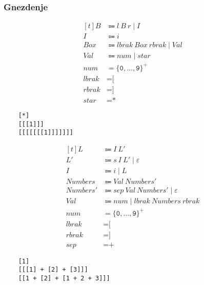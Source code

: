 \documentclass{report}
\newcommand{\Null}{\varepsilon}
\newcommand{\Char}[1]{\texttt{#1}}
\newcommand{\Spc}{\ }
\newcommand{\Union}{\mathrel{|}}
\newcommand{\KleenePlus}[1]{#1^+}
\newcommand{\Arrow}{\Coloneq}
\newcommand{\NT}[1]{{#1}}
\newcommand{\T}[1]{{#1}}
\begin{document}
    \subsubsection{Gnezdenje}

    \begin{equation*}
      \begin{aligned}[t]
        \NT{B} &\Arrow \T{l} \Spc \NT{B} \Spc \T{r} \Union \NT{I}\\
        \NT{I} &\Arrow \T{i}\\[1em]
        \NT{Box} &\Arrow \T{lbrak} \Spc \NT{Box} \Spc \T{rbrak} \Union \NT{Val}\\
        \NT{Val} &\Arrow \T{num} \Union \T{star}\\[1em]
        \T{num} &= \KleenePlus{\{\Char{0}, \dots, \Char{9}\}}\\
        \T{lbrak} &= \Char{[}\\
        \T{rbrak} &= \Char{]}\\
        \T{star} &= \Char{*}
      \end{aligned}
    \end{equation*}
    \begin{lstlisting}
    [*]
    [[[1]]]
    [[[[[[[1]]]]]]]
    \end{lstlisting}

    \begin{equation*}
      \begin{aligned}[t]
        \NT{L} &\Arrow \NT{I} \Spc \NT{L'}\\
        \NT{L'} &\Arrow \T{s} \Spc \NT{I} \Spc \NT{L'} \Union \Null\\
        \NT{I} &\Arrow \T{i} \Union \NT{L}\\[1em]
        \NT{Numbers} &\Arrow \T{Val} \Spc \NT{Numbers'}\\
        \NT{Numbers'} &\Arrow \T{sep} \Spc \T{Val} \Spc \NT{Numbers'} \Union \Null\\
        \NT{Val} &\Arrow \T{num} \Union \T{lbrak} \Spc \NT{Numbers} \Spc \T{rbrak}\\[1em]
        \T{num} &= \KleenePlus{\{\Char{0}, \dots, \Char{9}\}}\\
        \T{lbrak} &= \Char{[}\\
        \T{rbrak} &= \Char{]}\\
        \T{sep} &= \Char{+}
      \end{aligned}
    \end{equation*}
    \begin{lstlisting}
    [1]
    [[[1] + [2] + [3]]]
    [[1 + [2] + [1 + 2 + 3]]]
    \end{lstlisting}
\end{document}
